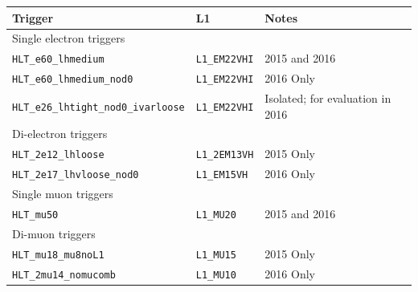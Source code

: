 \begin{table}[hbt]
\begin{center}
\begin{tabular}{|lll|}
\hline
Trigger                                       & L1                   & Notes \\ 
\hline\hline
\multicolumn{3}{|l|}{Single electron triggers} \\
\hline
\texttt{HLT\_e60\_lhmedium}                   & \texttt{L1\_EM22VHI} & 2015 and 2016 \\
\texttt{HLT\_e60\_lhmedium\_nod0}             & \texttt{L1\_EM22VHI} & 2016 Only \\
\texttt{HLT\_e26\_lhtight\_nod0\_ivarloose}   & \texttt{L1\_EM22VHI} & Isolated; for evaluation in 2016 \\
\hline
\multicolumn{3}{|l|}{Di-electron triggers} \\
\hline
\texttt{HLT\_2e12\_lhloose}                   & \texttt{L1\_2EM13VH} & 2015 Only \\
\texttt{HLT\_2e17\_lhvloose\_nod0}            & \texttt{L1\_EM15VH}  & 2016 Only \\
\hline\hline
\multicolumn{3}{|l|}{Single muon triggers} \\
\hline
\texttt{HLT\_mu50}                            & \texttt{L1\_MU20}    & 2015 and 2016 \\
\hline
\multicolumn{3}{|l|}{Di-muon triggers} \\
\hline
\texttt{HLT\_mu18\_mu8noL1}                   & \texttt{L1\_MU15}    & 2015 Only \\
\texttt{HLT\_2mu14\_nomucomb}                 & \texttt{L1\_MU10}    & 2016 Only \\

\end{tabular}
\end{center}
\end{table}
